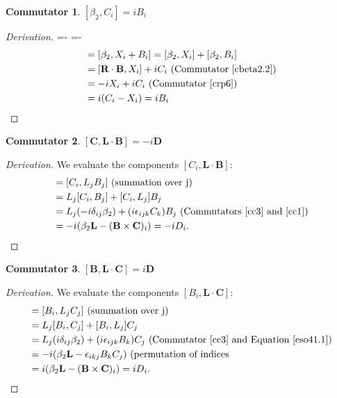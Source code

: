 \documentclass[12pt,a4paper]{report}
\theoremstyle{definition}
\newtheorem{commutator}{Commutator}[section]
\newenvironment{derivation}
  {\renewcommand\qedsymbol{$\square$}\begin{proof}[Derivation]}
  {\end{proof}}
\theoremstyle{remark}
\theoremstyle{remark}
\begin{document}
\begin{appendices}
\begin{commutator}\label{cbeta2.3}
$[\beta_2,C_i]=iB_i$
\end{commutator}
\begin{derivation} 
\abovedisplayskip=-\baselineskip
\belowdisplayskip=0pt
\abovedisplayshortskip=-\baselineskip
\belowdisplayshortskip=0pt
\begin{align*}
[\beta_2,C_i]&=[\beta_2,X_i+B_i]=[\beta_2,X_i]+[\beta_2,B_i]\\
&= [\textbf{R}\cdot\textbf{B},X_i]+iC_i \text{ (Commutator~\ref{cbeta2.2})}\\
&=-iX_i+iC_i \text{ (Commutator~\ref{crp6})}\\
&=i(C_i-X_i)=iB_i
\end{align*}
\end{derivation}

\begin{commutator}\label{cblc1}
$[\textbf{C},\textbf{L}\cdot\textbf{B}]=-i\textbf{D}$
\end{commutator}
\begin{derivation} We evaluate the components $[C_i,\textbf{L}\cdot\textbf{B}]$:
\begin{align*}
[C_i,\textbf{L}\cdot\textbf{B}]&=[C_i,L_jB_j] \text{ (summation over j)}\\
&= L_j[C_i,B_j]+[C_i,L_j]B_j \\
&= L_j(-i\delta_{ij}\beta_2)+(i\epsilon_{ijk}C_k)B_j \text{ (Commutators~\ref{cc3} and~\ref{cc1})}\\
&=-i(\beta_2\textbf{L}-(\textbf{B}\times\textbf{C})_i)=-iD_i.
\end{align*}
\end{derivation}

\begin{commutator}\label{cblc2}
$[\textbf{B},\textbf{L}\cdot\textbf{C}]=i\textbf{D}$
\end{commutator}
\begin{derivation} We evaluate the components $[B_i,\textbf{L}\cdot\textbf{C}]$:
\begin{align*}
[B_i,\textbf{L}\cdot\textbf{C}]&=[B_i,L_jC_j] \text{ (summation over j)}\\
&= L_j[B_i,C_j]+[B_i,L_j]C_j \\
&= L_j(i\delta_{ij}\beta_2)+(i\epsilon_{ijk}B_k)C_j \text{ (Commutator~\ref{cc3} and Equation~\ref{eso41.1})}\\
&=-i(\beta_2\textbf{L}-\epsilon_{ikj}B_kC_j)\text{ (permutation of indices}\\
&=i(\beta_2\textbf{L}-(\textbf{B}\times\textbf{C})_i)=iD_i.
\end{align*}
\end{derivation}


\end{appendices}
\end{document}
